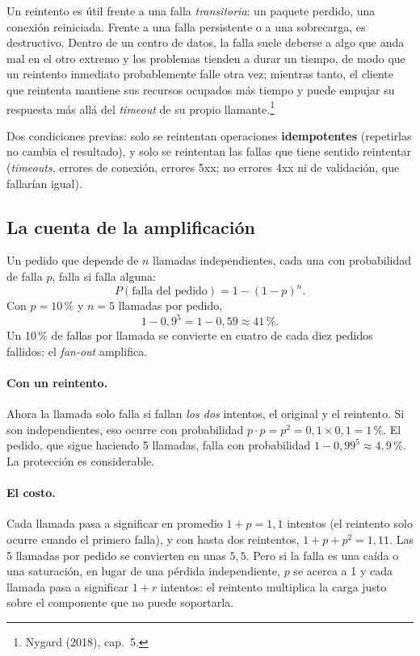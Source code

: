 \documentclass[variant=apuntes,cover=institutional,mode=screen]{ua-engineering-v6-article}
\begin{document}
Un reintento es útil frente a una falla \emph{transitoria}: un paquete perdido, una conexión reiniciada. Frente a una falla persistente o a una sobrecarga, es destructivo. Dentro de un centro de datos, la falla suele deberse a algo que anda mal en el otro extremo y los problemas tienden a durar un tiempo, de modo que un reintento inmediato probablemente falle otra vez; mientras tanto, el cliente que reintenta mantiene sus recursos ocupados más tiempo y puede empujar su respuesta más allá del \emph{timeout} de su propio llamante.\footnote{Nygard (2018), cap.~5.}

Dos condiciones previas: solo se reintentan operaciones \textbf{idempotentes} (repetirlas no cambia el resultado), y solo se reintentan las fallas que tiene sentido reintentar (\emph{timeouts}, errores de conexión, errores 5xx; no errores 4xx ni de validación, que fallarían igual).

\subsection{La cuenta de la amplificación}

Un pedido que depende de $n$ llamadas independientes, cada una con probabilidad de falla $p$, falla si falla alguna:
\[
P(\text{falla del pedido}) = 1 - (1-p)^n.
\]
Con $p = 10\,\%$ y $n = 5$ llamadas por pedido,
\[
1 - 0{,}9^{5} = 1 - 0{,}59 \approx 41\,\%.
\]
Un 10\,\% de fallas por llamada se convierte en cuatro de cada diez pedidos fallidos: el \emph{fan-out} amplifica.

\paragraph{Con un reintento.} Ahora la llamada solo falla si fallan \emph{los dos} intentos, el original y el reintento. Si son independientes, eso ocurre con probabilidad $p \cdot p = p^2 = 0{,}1 \times 0{,}1 = 1\,\%$. El pedido, que sigue haciendo 5 llamadas, falla con probabilidad $1 - 0{,}99^{5} \approx 4{,}9\,\%$. La protección es considerable.

\paragraph{El costo.} Cada llamada pasa a significar en promedio $1 + p = 1{,}1$ intentos (el reintento solo ocurre cuando el primero falla), y con hasta dos reintentos, $1 + p + p^2 = 1{,}11$. Las 5 llamadas por pedido se convierten en unas $5{,}5$. Pero si la falla es una caída o una saturación, en lugar de una pérdida independiente, $p$ se acerca a 1 y cada llamada pasa a significar $1 + r$ intentos: el reintento multiplica la carga justo sobre el componente que no puede soportarla.
\end{document}
